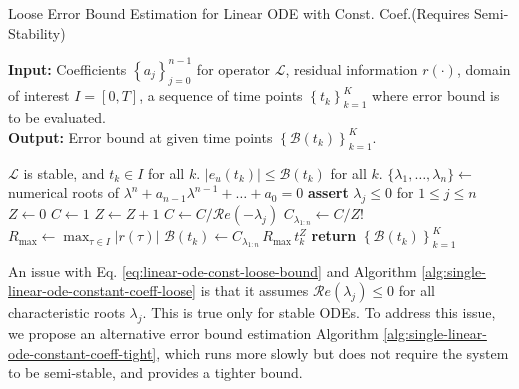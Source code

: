 \documentclass{article}
\newcommand{\Err}{e}
\newcommand{\Bound}{\mathcal{B}}
\renewcommand{\L}{\mathcal{L}}
\renewcommand{\Re}[1]{\mathcal{R}e\left(#1\right)}
\begin{document}
    \begin{algorithm}
        \caption{Loose Error Bound Estimation for Linear ODE with Const. Coef.\quad (Requires Semi-Stability)}\label{alg:single-linear-ode-constant-coeff-loose}
        \textbf{Input:} Coefficients $\left\{a_j\right\}_{j=0}^{n-1}$ for operator $\L$, residual information $r(\cdot)$, domain of interest $I = [0, T]$, a sequence of time points $\left\{t_k\right\}_{k=1}^{K}$ where error bound is to be evaluated.\\
        \textbf{Output:} Error bound at given time points $\left\{\Bound(t_k)\right\}_{k=1}^{K}$.

        \begin{algorithmic}
            \Require $\L$ is stable, and $t_k \in I$ for all $k$.
            \Ensure $\left|\Err_u(t_k)\right| \leq \Bound(t_k)$ for all $k$. 
            \vspace{0.5em}
            \State $\{\lambda_1, \dots, \lambda_n\} \gets$ numerical roots of $\lambda^n+a_{n-1}\lambda^{n-1}+\dots+a_0=0$ 
            \State \textbf{assert} $\lambda_j \leq 0$ for $1 \leq j \leq n$  
            \State $Z \gets 0$
            \State $C \gets 1$
                \If{$\Re{\lambda_j} = 0$}
                    \State $Z \gets Z + 1$
                \Else
                    \State $C \gets C / \Re{-\lambda_j}$
                \EndIf
            \EndFor
            \State $C_{\lambda_{1:n}}\gets C / Z!$
            \State $\displaystyle R_{\max} \gets \max_{\tau \in I} |r(\tau)|$ 
                \State $\Bound(t_k) \gets C_{\lambda_{1:n}}\, R_{\max}\, t_k^{Z} $
            \EndFor
            \State \textbf{return} $\left\{\Bound(t_k)\right\}_{k=1}^{K}$
        \end{algorithmic}
    \end{algorithm}

    An issue with Eq. \ref{eq:linear-ode-const-loose-bound} and Algorithm \ref{alg:single-linear-ode-constant-coeff-loose} is that it assumes $\Re{\lambda_j} \leq 0$ for all characteristic roots $\lambda_j$. 
    This is true only for stable ODEs. 
    To address this issue, we propose an alternative error bound estimation Algorithm \ref{alg:single-linear-ode-constant-coeff-tight}, which runs more slowly but does not require the system to be semi-stable, and provides a tighter bound.
\end{document}
